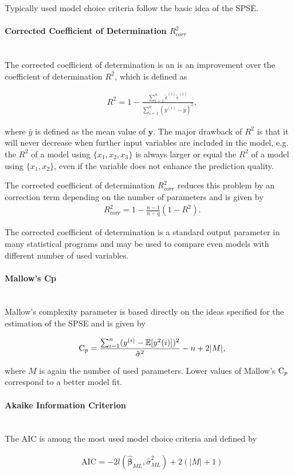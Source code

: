 \documentclass[10pt,a4paper]{article}
\newcommand{\subsubsubsection}[1]{\paragraph{#1}\mbox{}\\}
\begin{document}
Typically used model choice criteria follow the basic idea of the SPSE. \cite{fahrmeir2013regression}

\subsubsubsection{Corrected Coefficient of Determination $R^2_{corr}$}

The corrected coefficient of determination is an is an improvement over the coefficient of determination $R^2$, which is defined as 

\begin{align}
	R^2 = 1 - \frac{\sum_{i=1}^n \hat \epsilon^{(i)} \hat \epsilon^{(i)}}{\sum_{i=1}^n (y^{(i)} - \bar y)^2},
\end{align}

where $\bar y$ is defined as the mean value of $\boldsymbol{y}$. The major drawback of $R^2$ is that it will never decrease when further input variables are included in the model, e.g. the $R^2$ of a model using $\{x_1, x_2, x_3\}$ is always larger or equal the $R^2$ of a model using $\{x_1, x_2\}$, even if the variable does not enhance the prediction quality. 

The corrected coefficient of determination $R_{corr}^2$ reduces this problem by an correction term depending on the  number of parameters and is given by
\begin{align}
	R_{corr}^2 = 1 - \frac{n-1}{n-q}(1-R^2).
\end{align}

The corrected coefficient of determination is a standard output parameter in many statistical programs and may be used to compare even models with different number of used variables. \cite{fahrmeir2013regression}

\subsubsubsection{Mallow's Cp}

Mallow's complexity parameter is based directly on the ideas specified for the estimation of the SPSE and is given by

\begin{align}
	\text C_p = \frac{\sum_{i=1}^n (y^{(i)} - \mathbb{E}[y^2{(i)}])^2}{\hat \sigma^2} - n + 2 \vert M \vert,
\end{align}

where $M$ is again the number of used parameters. Lower values of Mallow's $\text C_p$ correspond to a better model fit. \cite{fahrmeir2013regression}

\subsubsubsection{Akaike Information Criterion}

The AIC is among the most used model choice criteria and defined by

\begin{align}
	\text{AIC} = -2 l(\boldsymbol{\hat{\beta}}_{ML}, \hat \sigma^2_{ML}) + 2(\vert M \vert +1)
\end{align}
\end{document}
